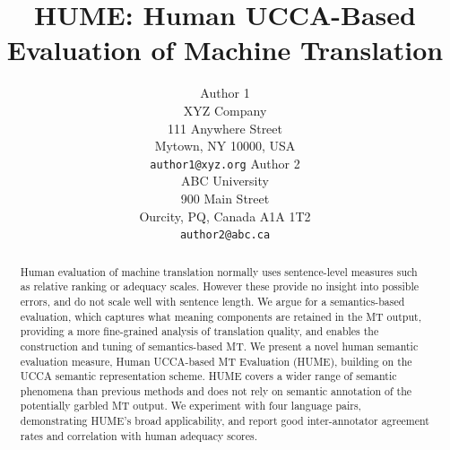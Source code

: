 \documentclass[11pt,letterpaper]{article}
\title{HUME: Human UCCA-Based Evaluation of Machine Translation}
\author{Author 1\\
	    XYZ Company\\
	    111 Anywhere Street\\
	    Mytown, NY 10000, USA\\
	    {\tt author1@xyz.org}
	  \And
	Author 2\\
  	ABC University\\
  	900 Main Street\\
  	Ourcity, PQ, Canada A1A 1T2\\
  {\tt author2@abc.ca}}
\date{}
\begin{document}
\maketitle

\begin{abstract}
  

Human evaluation of machine translation normally uses sentence-level measures such as relative ranking or adequacy scales. However these provide no insight into possible errors,
and do not scale well with sentence length.
We argue for a semantics-based evaluation, which captures what meaning components
are retained in the MT output, providing a more fine-grained analysis of
translation quality, and enables the construction and tuning of semantics-based MT. 
We present a novel human semantic evaluation measure, Human
UCCA-based MT Evaluation (HUME), building on the UCCA semantic representation scheme.
HUME covers
a wider range of semantic phenomena than previous methods and does not rely on semantic annotation
of the potentially garbled MT output. 
We experiment with four language pairs, demonstrating HUME's broad applicability,
and report good
inter-annotator agreement rates and 
 correlation with human adequacy scores.



\end{abstract}
\end{document}
